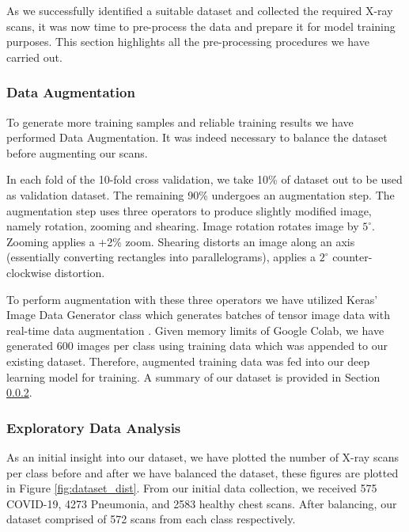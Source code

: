 As we successfully identified a suitable dataset and collected the required X-ray scans, it was now time to pre-process the data and prepare it for model training purposes. This section highlights all the pre-processing procedures we have carried out.

\subsubsection{Data Augmentation} \label{aug}

To generate more training samples and reliable training results we have performed Data Augmentation. It was indeed necessary to balance the dataset before augmenting our scans. 

In each fold of the 10-fold cross validation, we take 10\% of dataset out to be used as validation dataset. The remaining 90\% undergoes an augmentation step. The augmentation step uses three operators to produce slightly modified image, namely rotation, zooming and shearing. Image rotation rotates image by $5^{\circ}$. Zooming applies a +2\% zoom. Shearing distorts an image along an axis (essentially converting rectangles into parallelograms), applies a $2^{\circ}$ counter-clockwise distortion. 

To perform augmentation with these three operators we have utilized Keras' Image Data Generator class which generates batches of tensor image data with real-time data augmentation \cite{KER}. Given memory limits of Google Colab, we have generated 600 images per class using training data which was appended to our existing dataset. Therefore, augmented training data was fed into our deep learning model for training. A summary of our dataset is provided in Section \ref{eda}.

\subsubsection{Exploratory Data Analysis} \label{eda}
As an initial insight into our dataset, we have plotted the number of X-ray scans per class before and after we have balanced the dataset, these figures are plotted in Figure \ref{fig:dataset_dist}. From our initial data collection, we received 575 COVID-19, 4273 Pneumonia, and 2583 healthy chest scans. After balancing, our dataset comprised of 572 scans from each class respectively.



